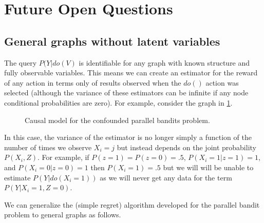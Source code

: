 \section{Future Open Questions}

\subsection{General graphs without latent variables}

The query $P(Y|do(V)$ is identifiable for any graph with known structure and fully observable variables. This means we can create an estimator for the reward of any action in terms only of results observed when the $do()$ action was selected (although the variance of these estimators can be infinite if any node conditional probabilities are zero). For example, consider the graph in \cref{fig:causalStructure_confounded}. 

\begin{figure}[h]
\centering
{}
\caption{Causal model for the confounded parallel bandits problem.\label{fig:causalStructure_confounded}}
\end{figure} 


In this case, the variance of the estimator is no longer simply a function of the number of times we observe $X_i = j$ but instead depends on the joint probability $P(X_i,Z)$. For example, if $P(z=1) = P(z=0) = .5$, $P(X_i = 1|z = 1) = 1$, and $P(X_i = 0|z = 0) = 1$ then $P(X_i = 1) = .5$ but we will will be unable to estimate $P(Y|do(X_i = 1))$ as we will never get any data for the term $P(Y|X_i = 1, Z = 0)$.

We can generalize the (simple regret) algorithm developed for the parallel bandit problem to general graphs as follows. 



